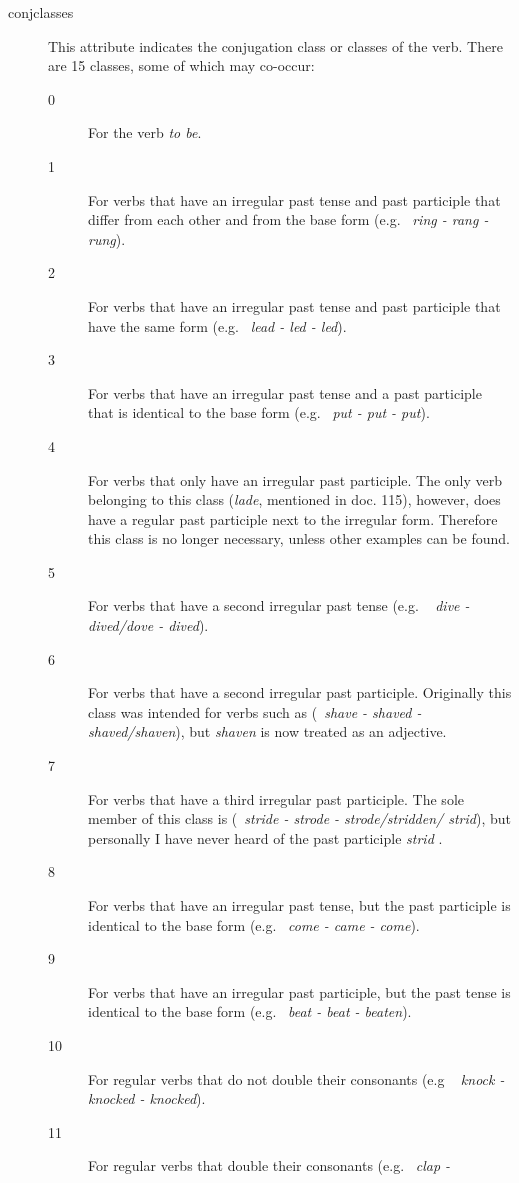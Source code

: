 \begin{description}
\item[conjclasses] This attribute indicates the conjugation class or classes of
the verb. There are 15 classes, some of which may co-occur:
\begin{description}
  \item [0] For the verb {\em to be}.
  \item [1] For verbs that have an irregular past tense and past participle 
that differ from each other and from the base form (e.g. \ {\em ring - rang - rung\/}).
  \item [2] For verbs that have an irregular past tense and past participle 
that have the same form (e.g. \ {\em lead - led - led\/}).
  \item [3] For verbs that have an irregular past tense and a past participle
that is identical to the base form (e.g. \ {\em put - put - put\/}).
  \item [4] For verbs that only have an irregular past participle. The only 
verb belonging to this class ({\em lade}, mentioned in doc. 115), however, 
does have a 
regular past participle next to the irregular form. Therefore this class is no 
longer necessary, unless other examples can be found.
  \item [5] For verbs that have a second irregular past tense (e.g. \ {\em 
dive - dived/dove - dived\/}).
  \item [6] For verbs that have a second irregular past participle. Originally 
this class was intended for verbs such as 
(\ {\em shave - shaved - shaved/shaven\/}), but {\em shaven} is now treated as 
an adjective.
  \item [7] For verbs that have a third irregular past participle. The sole 
member of this class is (\ {\em stride - strode - strode/stridden/
strid\/}), but personally I have never heard of the past participle {\em strid}
.
  \item [8] For verbs that have an irregular past tense, but the past participle 
 is identical to the base form (e.g. \ {\em come - came - come\/}).
  \item [9] For verbs that have an irregular past participle, but the past 
tense is identical to the base form (e.g. \ {\em beat - beat - beaten\/}).
  \item [10] For regular verbs that do not double their consonants (e.g \ {\em 
knock - knocked - knocked\/}). 
  \item [11] For regular verbs that double their consonants (e.g. \ {\em clap - 
}
\end{description}
\end{description}
